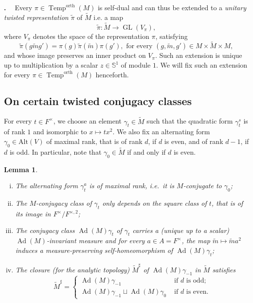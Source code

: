 \documentclass[12pt]{article}
\newenvironment{paragr}[1][]{\refstepcounter{subsubsection} \noindent \textbf{\thesubsubsection . \ #1}}{\medskip}
\newtheorem{lem}{Lemma}[section]
\numberwithin{equation}{section}
\def\tM{\widetilde{M}}
\def\tm{\widetilde{m}}
\def\Alt{\mathrm{Alt}}
\def\tpi{\widetilde{\pi}}
\DeclareMathOperator{\orth}{orth}
\DeclareMathOperator{\Temp}{Temp}
\DeclareMathOperator{\Ad}{Ad}
\DeclareMathOperator{\GL}{\mathrm{GL}}
\begin{document}
\begin{paragr}
Every $\pi\in \Temp^{\orth}(M)$ is self-dual and can thus be extended to a {\em unitary twisted representation} $\tpi$ of $\tM$ i.e. a map
$$\displaystyle \tpi: \tM\to \GL(V_\pi),$$
where $V_\pi$ denotes the space of the representation $\pi$, satisfying
$$\displaystyle \tpi(g\tm g')=\pi(g)\tpi(\tm)\pi(g'), \mbox{ for every } (g,\tm,g')\in M\times \tM\times M,$$
and whose image preserves an inner product on $V_\pi$. Such an extension is unique up to multiplication by a scalar $z\in \mathbb{S}^1$ of module $1$. We will fix such an extension for every $\pi\in \Temp^{\orth}(M)$ henceforth.
\end{paragr}




\subsection{On certain twisted conjugacy classes}	
	
	For every $t\in F^\times$, we choose an element $\gamma_t\in \tM$ such that the quadratic form $\gamma_t^s$ is of rank $1$ and isomorphic to $x\mapsto tx^2$. We also fix an alternating form $\gamma_0\in \Alt(V)$ of maximal rank, that is of rank $d$, if $d$ is even, and of rank $d-1$, if $d$ is odd. In particular, note that $\gamma_0\in \tM$ if and only if $d$ is even.
	
	
	\begin{lem}
		\begin{enumerate}[(i)]
			\item The alternating form $\gamma_t^a$ is of maximal rank, i.e.\ it is $M$-conjugate to $\gamma_0$;
			
			\item The $M$-conjugacy class of $\gamma_t$ only depends on the square class of $t$, that is of its image in $F^\times/F^{\times,2}$;
			
			\item The conjugacy class $\Ad(M)\gamma_{t}$ of $\gamma_t$ carries a (unique up to a scalar) $\Ad(M)$-invariant measure and for every $a\in A=F^\times$, the map $\tilde{m}\mapsto \tilde{m}a^2$ induces a measure-preserving self-homeomorphism of $\Ad(M)\gamma_t$;
			
			\item The closure (for the analytic topology)  $\tM^\sharp$ of $\Ad(M)\gamma_{-1}$ in $\tM$ satisfies
			$$\displaystyle \tM^\sharp=\left\{\begin{array}{ll}
				\Ad(M)\gamma_{-1} & \mbox{ if } d \mbox{ is odd}; \\
				\Ad(M)\gamma_{-1}\sqcup \Ad(M)\gamma_0 & \mbox{ if } d \mbox{ is even.}
			\end{array} \right.$$
		\end{enumerate}
	\end{lem}
	
\end{document}
